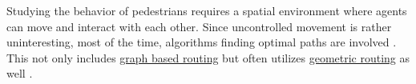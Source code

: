 	Studying the behavior of pedestrians requires a spatial environment where agents can move and interact with each other.
	Since uncontrolled movement is rather uninteresting, most of the time, algorithms finding optimal paths are involved \cite{kneidl-borrmann-hartmann-navigation,gloor-hybrid-pedestrian-routing,teknomo-millonig-routing}.
	This not only includes \hyperref[sec:graph-routing]{graph based routing} but often utilizes \hyperref[sec:geometric-routing]{geometric routing} as well \cite{kneidl-borrmann-hartmann-navigation}.
	
